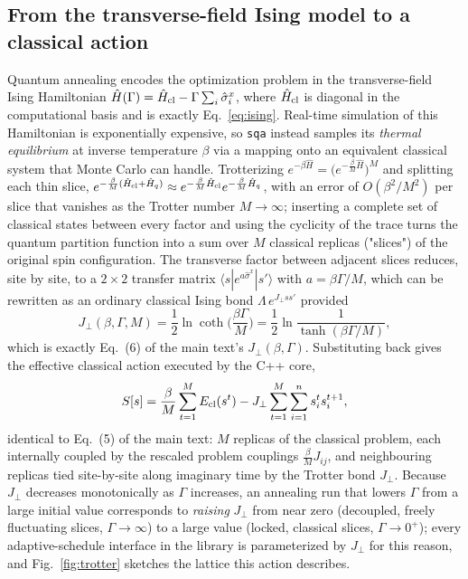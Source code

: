 \documentclass[11pt]{article}
\begin{document}
\subsection{From the transverse-field Ising model to a classical action}
Quantum annealing encodes the optimization problem in the transverse-field Ising Hamiltonian
$\hat H(\Gamma) = \hat H_{\rm cl} - \Gamma\sum_i\hat\sigma_i^x$, where $\hat H_{\rm cl}$ is
diagonal in the computational basis and is exactly Eq.~\eqref{eq:ising}. Real-time simulation of
this Hamiltonian is exponentially expensive, so \texttt{sqa} instead samples its \emph{thermal
equilibrium} at inverse temperature $\beta$ via a mapping onto an equivalent classical system that
Monte Carlo can handle. Trotterizing $e^{-\beta\hat H}=\big(e^{-\frac{\beta}{M}\hat H}\big)^M$ and
splitting each thin slice, $e^{-\frac{\beta}{M}(\hat H_{\rm cl}+\hat H_q)} \approx
e^{-\frac{\beta}{M}\hat H_{\rm cl}}e^{-\frac{\beta}{M}\hat H_q}$, with an error of
$O(\beta^2/M^2)$ per slice that vanishes as the Trotter number $M\to\infty$; inserting a complete
set of classical states between every factor and using the cyclicity of the trace turns the
quantum partition function into a sum over $M$ classical replicas ("slices") of the original spin
configuration. The transverse factor between adjacent slices reduces, site by site, to a $2\times2$
transfer matrix $\langle s|e^{a\hat\sigma^x}|s'\rangle$ with $a=\beta\Gamma/M$, which can be
rewritten as an ordinary classical Ising bond $\Lambda\,e^{J_\perp s s'}$ provided
\begin{equation}
J_\perp(\beta,\Gamma,M) = \frac{1}{2}\ln\coth\!\Big(\frac{\beta\Gamma}{M}\Big)
= \frac12\ln\frac{1}{\tanh(\beta\Gamma/M)},
\label{eq:jperp}
\end{equation}
which is exactly Eq.~(6) of the main text's $J_\perp(\beta,\Gamma)$. Substituting back gives the
effective classical action executed by the C++ core,
\begin{equation}
S[s] = \frac{\beta}{M}\sum_{t=1}^M E_{\rm cl}(s^t) - J_\perp\sum_{t=1}^M\sum_{i=1}^n s_i^t s_i^{t+1},
\label{eq:seff}
\end{equation}
identical to Eq.~(5) of the main text: $M$ replicas of the classical problem, each internally
coupled by the rescaled problem couplings $\frac{\beta}{M}J_{ij}$, and neighbouring replicas tied
site-by-site along imaginary time by the Trotter bond $J_\perp$. Because $J_\perp$ decreases
monotonically as $\Gamma$ increases, an annealing run that lowers $\Gamma$ from a large initial
value corresponds to \emph{raising} $J_\perp$ from near zero (decoupled, freely fluctuating
slices, $\Gamma\to\infty$) to a large value (locked, classical slices, $\Gamma\to0^+$); every
adaptive-schedule interface in the library is parameterized by $J_\perp$ for this reason, and
Fig.~\ref{fig:trotter} sketches the lattice this action describes.
\end{document}
